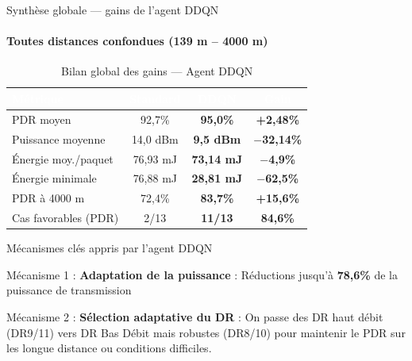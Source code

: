 \documentclass[aspectratio=169, 11pt]{beamer}
\newcommand{\cellgreen}[1]{\cellcolor{green!10}\textcolor{green!50!black}{\textbf{#1}}}
\begin{document}
	\begin{frame}{Synthèse globale — gains de l'agent DDQN}
		\framesubtitle{Toutes distances confondues (139 m -- 4000 m)}
		
		\begin{table}
			\centering
			\renewcommand{\arraystretch}{1.35}
			\begin{tabular}{|l|c|c|c|}
				\hline
				\rowcolor{blue!50}
				\textcolor{white}{\textbf{Métrique}} &
				\textcolor{white}{\textbf{Standard}} &
				\textcolor{white}{\textbf{DDQN}} &
				\textcolor{white}{\textbf{Gain}} \\
				\hline
				PDR moyen              & 92,7\%    & \textbf{95,0\%}  & \cellgreen{+2,48\%} \\
				\hline
				Puissance moyenne      & 14,0 dBm  & \textbf{9,5 dBm} & \cellgreen{$-$32,14\%} \\
				\hline
				Énergie moy./paquet    & 76,93 mJ  & \textbf{73,14 mJ}& \cellgreen{$-$4,9\%} \\
				\hline
				Énergie minimale       & 76,88 mJ  & \textbf{28,81 mJ}& \cellgreen{$-$62,5\%} \\
				\hline
				PDR à 4000 m           & 72,4\%    & \textbf{83,7\%}  & \cellgreen{+15,6\%} \\
				\hline
				Cas favorables (PDR)   & 2/13      & \textbf{11/13}   & \cellgreen{84,6\%} \\
				\hline
			\end{tabular}
			\caption{Bilan global des gains — Agent DDQN}
			\label{tab:synthese_gains}
		\end{table}
		
\end{frame}

\begin{frame}{Mécanismes clés appris par l'agent  DDQN }
	\textbf{}

			\begin{exampleblock}{Mécanisme 1 : }
				\textbf{Adaptation de la puissance } : Réductions jusqu'à \textbf{78,6\% } de la puissance de transmission
			\end{exampleblock}
	
			\begin{exampleblock}{Mécanisme 2 : }
				\textbf{Sélection adaptative du DR} : On passe des DR haut débit (DR9/11) vers DR Bas Débit mais robustes (DR8/10) pour maintenir le PDR sur les longue distance ou conditions difficiles.
			\end{exampleblock}	
		
\end{frame}
	
\end{document}
